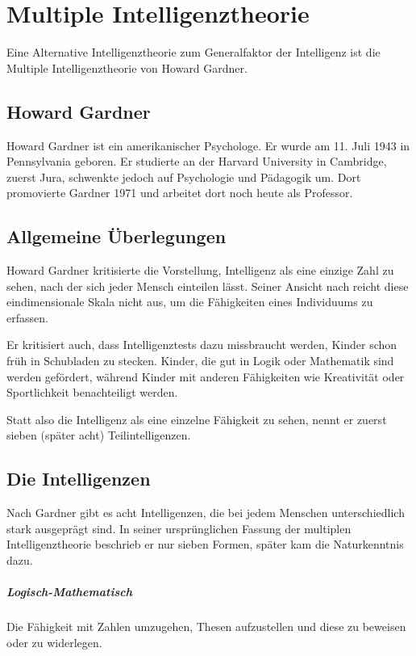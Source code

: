 \chapter{Multiple Intelligenztheorie}
Eine Alternative Intelligenztheorie zum Generalfaktor der Intelligenz ist die Multiple Intelligenztheorie von Howard Gardner.

\section{Howard Gardner}
Howard Gardner ist ein amerikanischer Psychologe. Er wurde am 11. Juli 1943 in Pennsylvania geboren. Er studierte an der Harvard University in Cambridge, zuerst Jura, schwenkte jedoch auf Psychologie und Pädagogik um. Dort promovierte Gardner 1971 und arbeitet dort noch heute als Professor. \cite{cv_gardner}

\section{Allgemeine Überlegungen}
Howard Gardner kritisierte die Vorstellung, Intelligenz als eine einzige Zahl zu sehen, nach der sich jeder Mensch einteilen lässt. Seiner Ansicht nach reicht diese eindimensionale Skala nicht aus, um die Fähigkeiten eines Individuums zu erfassen.

Er kritisiert auch, dass Intelligenztests dazu missbraucht werden, Kinder schon früh in \glqq Schubladen zu stecken\grqq{}. Kinder, die gut in Logik oder Mathematik sind werden gefördert, während Kinder mit anderen Fähigkeiten wie Kreativität oder Sportlichkeit benachteiligt werden.

Statt also die Intelligenz als eine einzelne Fähigkeit zu sehen, nennt er zuerst sieben (später acht) Teilintelligenzen. \cite{gardner_mi}

\section{Die Intelligenzen}
Nach Gardner gibt es acht Intelligenzen, die bei jedem Menschen unterschiedlich stark ausgeprägt sind. In seiner ursprünglichen Fassung der multiplen Intelligenztheorie beschrieb er nur sieben Formen, später kam die Naturkenntnis dazu.
\paragraph{Logisch-Mathematisch}
Die Fähigkeit mit Zahlen umzugehen, Thesen aufzustellen und diese zu beweisen oder zu widerlegen.
